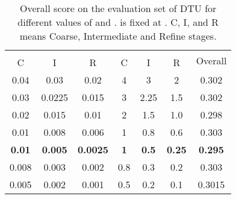 \documentclass[10pt,twocolumn,letterpaper]{article}
\begin{document}
\begin{table}[t]
  \begin{center}
    {\footnotesize{
\begin{tabular}{ccccccc}
    \toprule
    \multicolumn{3}{c}{} & \multicolumn{3}{c}{} & \multirow{2}{*}{Overall} \\
    \cmidrule{1-6}
    C & I & R & C & I & R &  \\
    \midrule
    0.04 & 0.03 & 0.02 & 4 & 3 & 2 & 0.302\\
    0.03 & 0.0225 & 0.015 & 3 & 2.25 & 1.5 & 0.302 \\
    0.02 & 0.015 & 0.01 & 2 & 1.5 & 1.0 & 0.298 \\
    0.01 & 0.008 & 0.006 & 1 & 0.8 & 0.6 & 0.303 \\
    \textbf{0.01} & \textbf{0.005} & \textbf{0.0025} & \textbf{1} & \textbf{0.5} & \textbf{0.25} & \textbf{0.295} \\
0.008 & 0.003 & 0.002 & 0.8 & 0.3 & 0.2 & 0.303 \\
    0.005 & 0.002 & 0.001 & 0.5 & 0.2 & 0.1 & 0.3015 \\
    \bottomrule
\end{tabular}
}}
\vspace{-6pt}
\caption{Overall score on the evaluation set of DTU \cite{jensen2014dtu} for different values of  and .  is fixed at . C, I, and R means Coarse, Intermediate and Refine stages.}
\label{table:gc-module-hyperparameter}
\vspace{-8pt}
\end{center}



\end{table}
\end{document}
